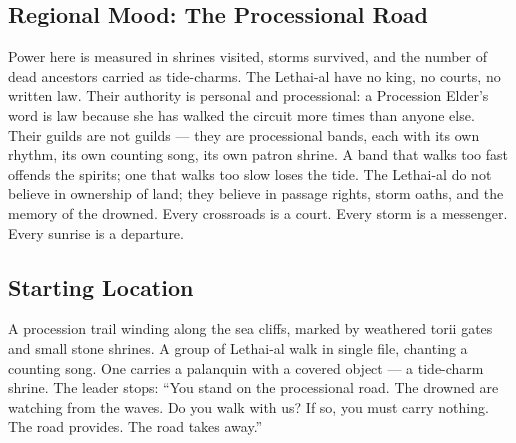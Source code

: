 \subsection*{Regional Mood: The Processional Road}

Power here is measured in shrines visited, storms survived, and the number of dead ancestors carried as tide-charms. The Lethai-al have no king, no courts, no written law. Their authority is personal and processional: a Procession Elder's word is law because she has walked the circuit more times than anyone else. Their guilds are not guilds --- they are processional bands, each with its own rhythm, its own counting song, its own patron shrine. A band that walks too fast offends the spirits; one that walks too slow loses the tide. The Lethai-al do not believe in ownership of land; they believe in passage rights, storm oaths, and the memory of the drowned. Every crossroads is a court. Every storm is a messenger. Every sunrise is a departure.

\subsection*{Starting Location}

A procession trail winding along the sea cliffs, marked by weathered torii gates and small stone shrines. A group of Lethai-al walk in single file, chanting a counting song. One carries a palanquin with a covered object --- a tide-charm shrine. The leader stops: ``You stand on the processional road. The drowned are watching from the waves. Do you walk with us? If so, you must carry nothing. The road provides. The road takes away.''

